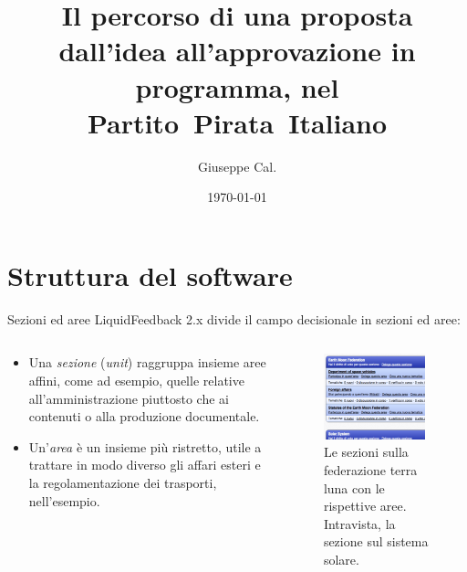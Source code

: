 \documentclass[ignorenonframetext,11pt]{beamer}\usetheme{default}
\title{Il percorso di una proposta dall'idea all'approvazione in programma, nel Partito~Pirata~Italiano}
\author{Giuseppe Cal.}
\institute{Partito Pirata Italiano -- Pirate Party of Italy}
\date{\today}
\begin{document}
\begin{frame}
\maketitle
\end{frame}

\section{Struttura del software}
\begin{frame}{Sezioni ed aree}
LiquidFeedback 2.x divide il campo decisionale in sezioni ed aree: 
\begin{columns}
\begin{column}{0.5\textwidth}
\begin{itemize}
\item Una \emph{sezione} (\emph{unit}) raggruppa insieme aree affini, come ad esempio, quelle relative all'amministrazione piuttosto che ai contenuti o alla produzione documentale.
\item Un'\emph{area} è un insieme più ristretto, utile a trattare in modo diverso gli affari esteri e la regolamentazione dei trasporti, nell'esempio.
\end{itemize}
\end{column}
\begin{column}{0.5\textwidth}
\begin{figure}
\includegraphics[width=0.95\textwidth]{pics/unitarea}
\caption{Le sezioni sulla federazione terra luna con le rispettive aree. Intravista, la sezione sul sistema solare.}
\end{figure}
\end{column}
\end{columns}
\end{frame}
\end{document}
